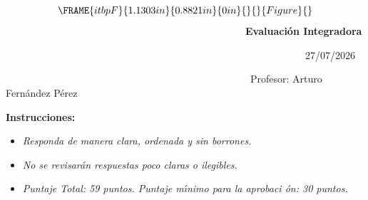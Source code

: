 \documentclass{article}
\begin{document}
\ 
\begin{equation*}
\FRAME{itbpF}{1.1303in}{0.8821in}{0in}{}{}{Figure}{\special{language
"Scientific Word";type "GRAPHIC";maintain-aspect-ratio TRUE;display
"USEDEF";valid_file "T";width 1.1303in;height 0.8821in;depth
0in;original-width 2.3531in;original-height 1.8291in;cropleft "0";croptop
"1";cropright "1";cropbottom "0";tempfilename
'TI86TE00.bmp';tempfile-properties "XPR";}}
\end{equation*}%
\ \ \ \ \ \ \ \ \ \ \ \ \ \ \ \ \ \ \ \ \ \ \ \ \ \ \ \ \ \ \ \ \ \ \ \ \ \
\ \ \ \ \ \ \ \ \ \ \textbf{Evaluaci\'{o}n Integradora}

\ \ \ \ \ \ \ \ \ \ \ \ \ \ \ \ \ \ \ \ \ \ \ \ \ \ \ \ \ \ \ \ \ \ \ \ \ \
\ \ \ \ \ \ \ \ \ \ \ \ \ \ \ \ \ \ \ \ \ \ 27/07/2026

\noindent\ \ \ \ \ \ \ \ \ \ \ \ \ \ \ \ \ \ \ \ \ \ \ \ \ \ \ \ \ \ \ \ \ \
\ \ \ \ \ \ \ \ \ \ \ \ \ \ \ Profesor: Arturo Fern\'{a}ndez P\'{e}rez 
\hspace*{\stretch{0.7500}}

\bigskip

\textbf{Instrucciones: }

\begin{itemize}
\item \emph{Responda de manera clara, ordenada y sin borrones. }

\item \emph{No se revisar\'{a}n respuestas poco claras o ilegibles. }

\item \emph{Puntaje Total: 59 puntos. Puntaje m\'{\i}nimo para la aprobaci%
\'{o}n: 30 puntos.}
\end{itemize}

\bigskip
\end{document}
